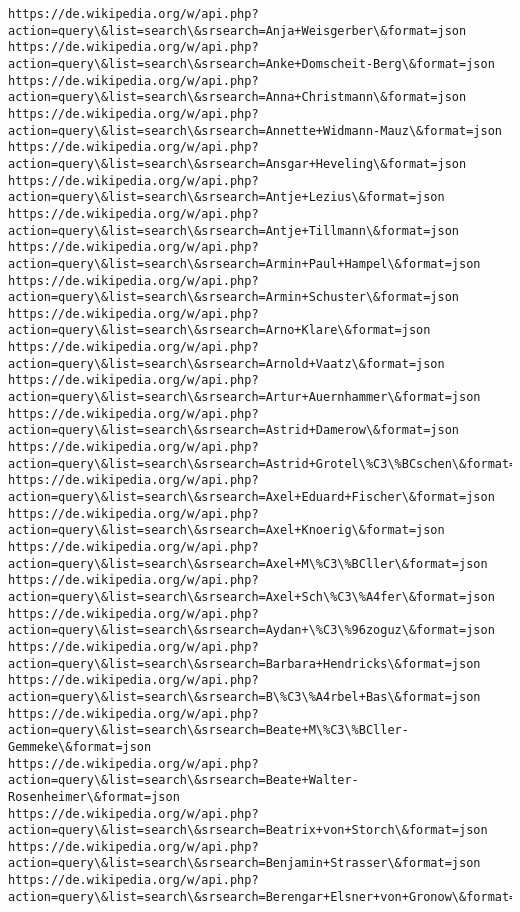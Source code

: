 \documentclass[11pt]{article}
\begin{document}
\begin{Verbatim}[commandchars=\\\{\}]
https://de.wikipedia.org/w/api.php?action=query\&list=search\&srsearch=Anja+Weisgerber\&format=json
https://de.wikipedia.org/w/api.php?action=query\&list=search\&srsearch=Anke+Domscheit-Berg\&format=json
https://de.wikipedia.org/w/api.php?action=query\&list=search\&srsearch=Anna+Christmann\&format=json
https://de.wikipedia.org/w/api.php?action=query\&list=search\&srsearch=Annette+Widmann-Mauz\&format=json
https://de.wikipedia.org/w/api.php?action=query\&list=search\&srsearch=Ansgar+Heveling\&format=json
https://de.wikipedia.org/w/api.php?action=query\&list=search\&srsearch=Antje+Lezius\&format=json
https://de.wikipedia.org/w/api.php?action=query\&list=search\&srsearch=Antje+Tillmann\&format=json
https://de.wikipedia.org/w/api.php?action=query\&list=search\&srsearch=Armin+Paul+Hampel\&format=json
https://de.wikipedia.org/w/api.php?action=query\&list=search\&srsearch=Armin+Schuster\&format=json
https://de.wikipedia.org/w/api.php?action=query\&list=search\&srsearch=Arno+Klare\&format=json
https://de.wikipedia.org/w/api.php?action=query\&list=search\&srsearch=Arnold+Vaatz\&format=json
https://de.wikipedia.org/w/api.php?action=query\&list=search\&srsearch=Artur+Auernhammer\&format=json
https://de.wikipedia.org/w/api.php?action=query\&list=search\&srsearch=Astrid+Damerow\&format=json
https://de.wikipedia.org/w/api.php?action=query\&list=search\&srsearch=Astrid+Grotel\%C3\%BCschen\&format=json
https://de.wikipedia.org/w/api.php?action=query\&list=search\&srsearch=Axel+Eduard+Fischer\&format=json
https://de.wikipedia.org/w/api.php?action=query\&list=search\&srsearch=Axel+Knoerig\&format=json
https://de.wikipedia.org/w/api.php?action=query\&list=search\&srsearch=Axel+M\%C3\%BCller\&format=json
https://de.wikipedia.org/w/api.php?action=query\&list=search\&srsearch=Axel+Sch\%C3\%A4fer\&format=json
https://de.wikipedia.org/w/api.php?action=query\&list=search\&srsearch=Aydan+\%C3\%96zoguz\&format=json
https://de.wikipedia.org/w/api.php?action=query\&list=search\&srsearch=Barbara+Hendricks\&format=json
https://de.wikipedia.org/w/api.php?action=query\&list=search\&srsearch=B\%C3\%A4rbel+Bas\&format=json
https://de.wikipedia.org/w/api.php?action=query\&list=search\&srsearch=Beate+M\%C3\%BCller-Gemmeke\&format=json
https://de.wikipedia.org/w/api.php?action=query\&list=search\&srsearch=Beate+Walter-Rosenheimer\&format=json
https://de.wikipedia.org/w/api.php?action=query\&list=search\&srsearch=Beatrix+von+Storch\&format=json
https://de.wikipedia.org/w/api.php?action=query\&list=search\&srsearch=Benjamin+Strasser\&format=json
https://de.wikipedia.org/w/api.php?action=query\&list=search\&srsearch=Berengar+Elsner+von+Gronow\&format=json

\end{Verbatim}
\end{document}
